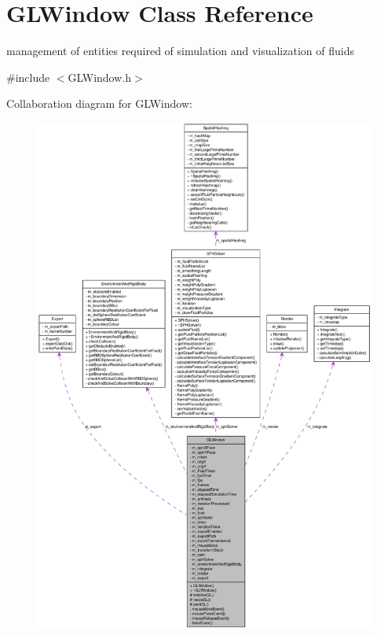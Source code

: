 \hypertarget{class_g_l_window}{
\section{GLWindow Class Reference}
\label{class_g_l_window}
}


management of entities required of simulation and visualization of fluids  




{\ttfamily \#include $<$GLWindow.h$>$}



Collaboration diagram for GLWindow:\nopagebreak
\begin{figure}[H]
\begin{center}
\leavevmode
\includegraphics[width=400pt]{class_g_l_window__coll__graph}
\end{center}
\end{figure}
